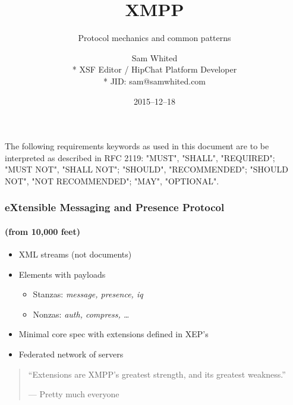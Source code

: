 \documentclass[xelatex,aspectratio=169]{beamer}
\title[]{XMPP}
\subtitle{Protocol mechanics and common patterns}
\author[]{%
	Sam Whited\\*%
	{\tiny XSF Editor / HipChat Platform Developer}\\*%
	{\tiny JID: sam@samwhited.com}%
}
\date{2015--12--18}
\begin{document}
\begin{frame}
	\maketitle
\end{frame}

\begin{frame}
	\ttfamily%
	The following requirements keywords as used in this document are to be
	interpreted as described in RFC 2119: "MUST", "SHALL", "REQUIRED"; "MUST NOT",
	"SHALL NOT"; "SHOULD", "RECOMMENDED"; "SHOULD NOT", "NOT RECOMMENDED"; "MAY",
	"OPTIONAL".
\end{frame}

\begin{frame}
	\frametitle{eXtensible Messaging and Presence Protocol}
	\framesubtitle{(from 10,000 feet)}
	\begin{itemize}
		\item XML streams (not documents)
		\item Elements with payloads
			\begin{itemize}
				\item Stanzas: \textit{message, presence, iq}
				\item Nonzas: \textit{auth, compress, \ldots}
			\end{itemize}
		\item Minimal core spec with extensions defined in XEP's
		\item Federated network of servers
	\end{itemize}
\end{frame}

\begin{frame}
\begin{quotation}
	``Extensions are XMPP's greatest strength, and its greatest weakness.''
	\begin{flushright}
		--- Pretty much everyone
	\end{flushright}
\end{quotation}
\end{frame}
\end{document}

